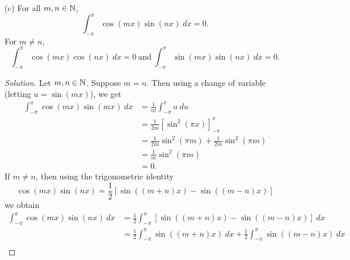 \begin{enumerate}
\begin{proof}[Solution]
            Similarly, we have
            \begin{align*}
                \int_{ - \pi  }^{ \pi  } \sin^{2}(nx)    \ dx &= \frac{ 1 }{ 2 }  \int_{ - \pi  }^{ \pi  } [ 1 - \cos(2xn) ]  \ dx \\
                                                              &= \frac{ 1 }{ 2 } \int_{ - \pi  }^{  \pi }  \ dx - \frac{ 1 }{ 2 }  \int_{ - \pi  }^{ \pi  } \cos(2xn) \ dx \\
                                                              &= \frac{ 1 }{ 2 } \cdot 2 \pi - 0  \\
                                                              &= \pi.
            \end{align*}
        \end{proof}
    \item[(c)] For all \( m,n \in \mathbb{N}  \), 
        \[  \int_{ - \pi  }^{ \pi  } \cos(mx) \sin(nx)  \ dx =  0. \]
        For \( m \neq n  \), 
        \[  \int_{ - \pi  }^{ \pi  } \cos(mx) \cos(nx) \ dx = 0 \ \text{and} \ \int_{ -\pi  }^{ \pi  } \sin(mx) \sin(nx)  \ dx = 0. \]
        \begin{proof}[Solution]
        Let \( m, n \in \mathbb{N}  \). Suppose \( m = n  \). Then using a change of variable (letting \( u = \sin(mx) \)), we get
        \begin{align*}
            \int_{ - \pi  }^{ \pi  } \cos(mx) \sin(mx)  \ dx &= \frac{ 1 }{ m } \int_{ - \pi  }^{ \pi } u    \ du \\
                                                             &= \frac{ 1 }{ 2m } [ \sin^{2}(\pi x)]_{- \pi}^{\pi}  \\
                                                             &= \frac{ 1 }{ 2m } \sin ^{2}( \pi m) + \frac{ 1 }{ 2m } \sin^{2}(\pi m) \\
                                                             &= \frac{ 1 }{ m } \sin ^{2}(\pi m) \\
                                                             &= 0.
        \end{align*}
        If \( m \neq n  \), then using the trigonometric identity 
        \[  \cos(mx)\sin(nx) =  \frac{ 1 }{ 2 } [ \sin((m+n)x) - \sin((m-n)x) ]  \]
        we obtain
        \begin{align*}
            \int_{ - \pi  }^{ \pi  } \cos(mx) \sin(nx)  \ dx &= \frac{ 1 }{ 2 } \int_{ - \pi  }^{ \pi  } [ \sin((m+n)x) - \sin((m-n)x)] \ dx \\
                                                             &= \frac{ 1 }{ 2 } \int_{ - \pi  }^{ \pi  } \sin((m+n)x)  \ dx + \frac{ 1 }{ 2 } \int_{ - \pi  }^{ \pi  } \sin((m-n)x) \ dx \\

\end{align*}
\end{proof}
\end{enumerate}
